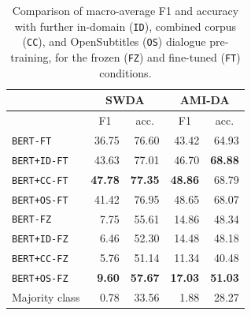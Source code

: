 \documentclass[11pt,a4paper]{article}
\begin{document}
\begin{table}[]
\begin{tabular}{@{}lrrrr@{}}
\toprule
           & \multicolumn{2}{c}{SWDA}                          & \multicolumn{2}{c}{AMI-DA}                        \\ \midrule
           & \multicolumn{1}{c}{F1} & \multicolumn{1}{c}{acc.} & \multicolumn{1}{c}{F1} & \multicolumn{1}{c}{acc.} \\
\texttt{BERT-FT}    & 36.75                  & 76.60                    & 43.42                  & 64.93                    \\
\texttt{BERT+ID-FT} & 43.63                  & 77.01                    & 46.70                  & \textbf{68.88}           \\
\texttt{BERT+CC-FT} & \textbf{47.78}         & \textbf{77.35}           & \textbf{48.86}         & 68.79                    \\ 
\texttt{BERT+OS-FT} & 41.42                  & 76.95                    & 48.65                  & 68.07                    \\ \midrule
\texttt{BERT-FZ}    &  7.75                  & 55.61           & 14.86                  & 48.34                    \\
\texttt{BERT+ID-FZ} &  6.46                  & 52.30                    & 14.48                  & 48.18                    \\
\texttt{BERT+CC-FZ} &  5.76                  & 51.14                    & 11.34                  & 40.48                    \\ 
\texttt{BERT+OS-FZ} &  \textbf{9.60}         & \textbf{57.67}           & \textbf{17.03}         & \textbf{51.03}           \\ \midrule
    Majority class  & 0.78                   & 33.56                    &  1.88                  & 28.27      \\ \bottomrule
\end{tabular}
\caption{Comparison of macro-average F1 and accuracy with further in-domain (\texttt{ID}), combined corpus (\texttt{CC}), and OpenSubtitles (\texttt{OS}) dialogue pre-training,
    for the frozen (\texttt{FZ}) and fine-tuned (\texttt{FT}) conditions.}
  \label{table:exp3}
\end{table}


\end{document}
